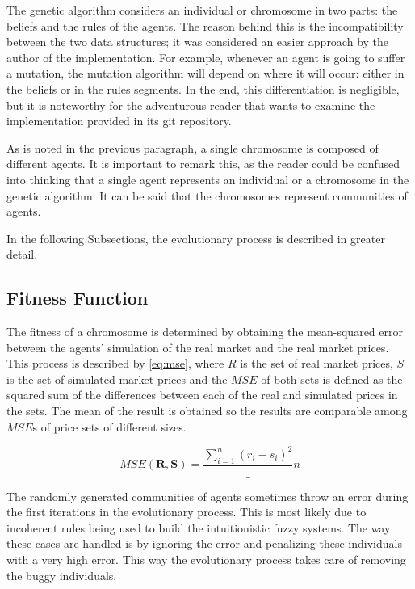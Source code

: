 The genetic algorithm considers an individual or chromosome in two parts: the
beliefs and the rules of the agents. The reason behind this is the
incompatibility between the two data structures; it was considered an easier
approach by the author of the implementation. For example, whenever an agent is
going to suffer a mutation, the mutation algorithm will depend on where it will
occur: either in the beliefs or in the rules segments. In the end, this
differentiation is negligible, but it is noteworthy for the adventurous reader
that wants to examine the implementation provided in its git repository.

As is noted in the previous paragraph, a single chromosome is composed of
different agents. It is important to remark this, as the reader could be
confused into thinking that a single agent represents an individual or a
chromosome in the genetic algorithm. It can be said that the chromosomes
represent communities of agents.

In the following Subsections, the evolutionary process is described in greater
detail.

\subsection{Fitness Function}
\label{subsection:fitness-function}

The fitness of a chromosome is determined by obtaining the mean-squared error
between the agents' simulation of the real market and the real market
prices. This process is described by \ref{eq:mse}, where $R$ is the set of real
market prices, $S$ is the set of simulated market prices and the $MSE$ of both
sets is defined as the squared sum of the differences between each of the real and
simulated prices in the sets. The mean of the result is obtained so the results
are comparable among $MSE$s of price sets of different sizes.

\begin{equation}
  \label{eq:mse}
  MSE(\bm{R}, \bm{S}) = \frac{\sum_{i=1}^{n}(r_i-s_i)^{2}}_{n}
\end{equation}

The randomly generated communities of agents sometimes throw an error during the
first iterations in the evolutionary process. This is most likely due to
incoherent rules being used to build the intuitionistic fuzzy systems. The way
these cases are handled is by ignoring the error and penalizing these
individuals with a very high error. This way the evolutionary process takes care
of removing the buggy individuals.


